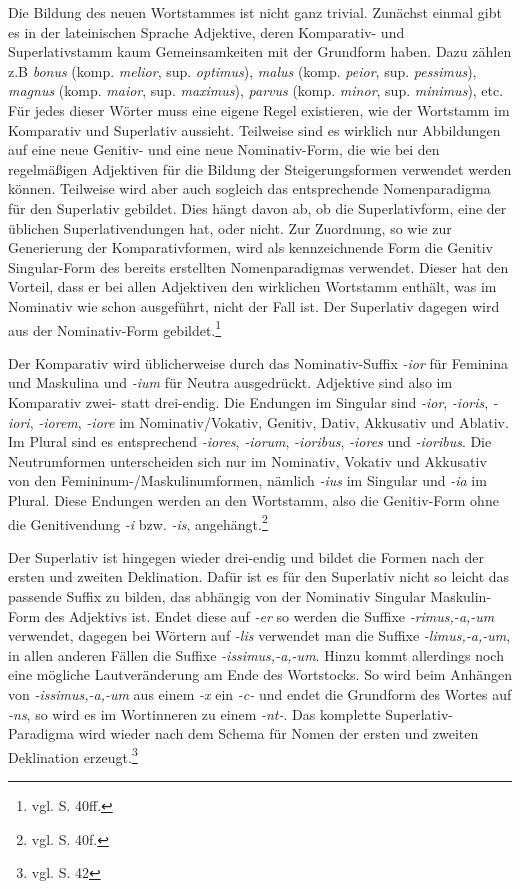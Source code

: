 Die Bildung des neuen Wortstammes ist nicht ganz trivial. Zunächst einmal gibt es in der lateinischen Sprache Adjektive, deren Komparativ- und Superlativstamm kaum Gemeinsamkeiten mit der Grundform haben. Dazu zählen z.B \textit{bonus} (komp. \textit{melior}, sup. \textit{optimus}), \textit{malus} (komp. \textit{peior}, sup. \textit{pessimus}), \textit{magnus} (komp. \textit{maior}, sup. \textit{maximus}), \textit{parvus} (komp. \textit{minor}, sup. \textit{minimus}), etc. Für jedes dieser Wörter muss eine eigene Regel existieren, wie der Wortstamm im Komparativ und Superlativ aussieht. Teilweise sind es wirklich nur Abbildungen auf eine neue Genitiv- und eine neue Nominativ-Form, die wie bei den regelmäßigen Adjektiven für die Bildung der Steigerungsformen verwendet werden können. Teilweise wird aber auch sogleich das entsprechende Nomenparadigma für den Superlativ gebildet. Dies hängt davon ab, ob die Superlativform, eine der üblichen Superlativendungen hat, oder nicht. Zur Zuordnung, so wie zur Generierung der Komparativformen, wird als kennzeichnende Form die Genitiv Singular-Form des bereits erstellten Nomenparadigmas verwendet. Dieser hat den Vorteil, dass er bei allen Adjektiven den wirklichen Wortstamm enthält, was im Nominativ wie schon ausgeführt, nicht der Fall ist. Der Superlativ dagegen wird aus der Nominativ-Form gebildet.\footnote{vgl. \cite{BAYER-LINDAUER1994} S. 40ff.} \par
Der Komparativ wird üblicherweise durch das Nominativ-Suffix \textit{-ior} für Feminina und Maskulina und \textit{-ium} für Neutra ausgedrückt. Adjektive sind also im Komparativ zwei- statt drei-endig. Die Endungen im Singular sind \textit{-ior}, \textit{-ioris}, \textit{-iori}, \textit{-iorem}, \textit{-iore} im Nominativ/Vokativ, Genitiv, Dativ, Akkusativ und Ablativ. Im Plural sind es entsprechend \textit{-iores}, \textit{-iorum}, \textit{-ioribus}, \textit{-iores} und \textit{-ioribus}. Die Neutrumformen unterscheiden sich nur im Nominativ, Vokativ und Akkusativ von den Femininum-/Maskulinumformen, nämlich \textit{-ius} im Singular und \textit{-ia} im Plural. Diese Endungen werden an den Wortstamm, also die Genitiv-Form ohne die Genitivendung \textit{-i} bzw. \textit{-is}, angehängt.\footnote{vgl. \cite{BAYER-LINDAUER1994} S. 40f.} \par
Der Superlativ ist hingegen wieder drei-endig und bildet die Formen nach der ersten und zweiten Deklination. Dafür ist es für den Superlativ nicht so leicht das passende Suffix zu bilden, das abhängig von der Nominativ Singular Maskulin-Form des Adjektivs ist. Endet diese auf \textit{-er} so werden die Suffixe \textit{-rimus,-a,-um} verwendet, dagegen bei Wörtern auf \textit{-lis} verwendet man die Suffixe \textit{-limus,-a,-um}, in allen anderen Fällen die Suffixe \textit{-issimus,-a,-um}. Hinzu kommt allerdings noch eine mögliche Lautveränderung am Ende des Wortstocks. So wird beim Anhängen von \textit{-issimus,-a,-um} aus einem \textit{-x} ein \textit{-c-} und endet die Grundform des Wortes auf \textit{-ns}, so wird es im Wortinneren zu einem \textit{-nt-}. Das komplette Superlativ-Paradigma wird wieder nach dem Schema für Nomen der ersten und zweiten Deklination erzeugt.\footnote{vgl. \cite{BAYER-LINDAUER1994} S. 42} \par
